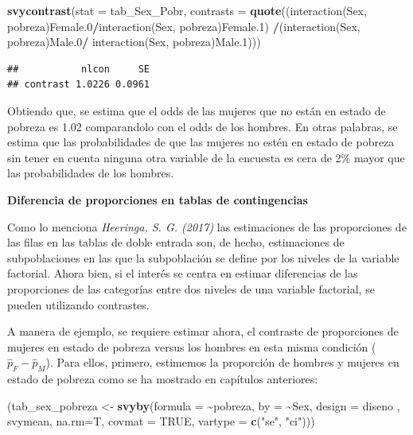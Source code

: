 \documentclass[
  12pt,
]{book}
\newenvironment{Shaded}{\begin{snugshade}}{\end{snugshade}}
\newcommand{\AttributeTok}[1]{\textcolor[rgb]{0.13,0.29,0.53}{#1}}
\newcommand{\ConstantTok}[1]{\textcolor[rgb]{0.56,0.35,0.01}{#1}}
\newcommand{\FunctionTok}[1]{\textcolor[rgb]{0.13,0.29,0.53}{\textbf{#1}}}
\newcommand{\NormalTok}[1]{#1}
\newcommand{\OtherTok}[1]{\textcolor[rgb]{0.56,0.35,0.01}{#1}}
\newcommand{\SpecialCharTok}[1]{\textcolor[rgb]{0.81,0.36,0.00}{\textbf{#1}}}
\newcommand{\StringTok}[1]{\textcolor[rgb]{0.31,0.60,0.02}{#1}}
\begin{document}
\begin{Shaded}
\begin{Highlighting}[]
\FunctionTok{svycontrast}\NormalTok{(}\AttributeTok{stat =}\NormalTok{ tab\_Sex\_Pobr, }
\AttributeTok{contrasts =} \FunctionTok{quote}\NormalTok{((}\StringTok{\textasciigrave{}}\AttributeTok{interaction(Sex, pobreza)Female.0}\StringTok{\textasciigrave{}}\SpecialCharTok{/}\StringTok{\textasciigrave{}}\AttributeTok{interaction(Sex, pobreza)Female.1}\StringTok{\textasciigrave{}}\NormalTok{) }\SpecialCharTok{/}\NormalTok{(}\StringTok{\textasciigrave{}}\AttributeTok{interaction(Sex, pobreza)Male.0}\StringTok{\textasciigrave{}}\SpecialCharTok{/} \StringTok{\textasciigrave{}}\AttributeTok{interaction(Sex, pobreza)Male.1}\StringTok{\textasciigrave{}}\NormalTok{)))}
\end{Highlighting}
\end{Shaded}

\begin{verbatim}
##           nlcon     SE
## contrast 1.0226 0.0961
\end{verbatim}

Obtiendo que, se estima que el odds de las mujeres que no están en estado de pobreza es 1.02 comparandolo con el odds de los hombres. En otras palabras, se estima que las probabilidades de que las mujeres no estén en estado de pobreza sin tener en cuenta ninguna otra variable de la encuesta es cera de 2\% mayor que las probabilidades de los hombres.

\textbf{Diferencia de proporciones en tablas de contingencias}

Como lo menciona \emph{Heeringa, S. G. (2017)} las estimaciones de las proporciones de las filas en las tablas de doble entrada son, de hecho, estimaciones de subpoblaciones en las que la subpoblación se define por los niveles de la variable factorial. Ahora bien, si el interés se centra en estimar diferencias de las proporciones de las categorías entre dos niveles de una variable factorial, se pueden utilizando contrastes.

A manera de ejemplo, se requiere estimar ahora, el contraste de proporciones de mujeres en estado de pobreza versus los hombres en esta misma condición (\(\hat{p}_F - \hat{p}_M\)). Para ellos, primero, estimemos la proporción de hombres y mujeres en estado de pobreza como se ha mostrado en capítulos anteriores:

\begin{Shaded}
\begin{Highlighting}[]
\NormalTok{(tab\_sex\_pobreza }\OtherTok{\textless{}{-}} \FunctionTok{svyby}\NormalTok{(}\AttributeTok{formula =} \SpecialCharTok{\textasciitilde{}}\NormalTok{pobreza, }\AttributeTok{by =} \SpecialCharTok{\textasciitilde{}}\NormalTok{Sex, }
                          \AttributeTok{design =}\NormalTok{ diseno , svymean, }\AttributeTok{na.rm=}\NormalTok{T,}
                          \AttributeTok{covmat =} \ConstantTok{TRUE}\NormalTok{, }\AttributeTok{vartype =} \FunctionTok{c}\NormalTok{(}\StringTok{"se"}\NormalTok{, }\StringTok{"ci"}\NormalTok{)))}
\end{Highlighting}
\end{Shaded}
\end{document}
